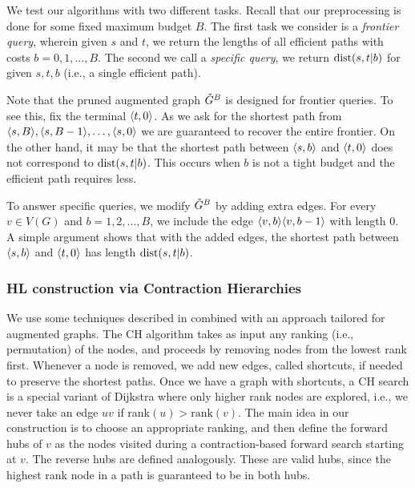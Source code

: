 \documentclass[opre,nonblindrev]{informs3} %
\begin{document}
We test our algorithms with two different tasks.
Recall that our preprocessing is done for some fixed maximum budget $B$.
The first task we consider is a \emph{frontier query}, wherein given $s$ and $t$, we return the lengths of all efficient paths with costs $b=0,1,\ldots,B$.
The second we call a \emph{specific query}, we return $\mbox{dist}(s,t|b)$ for given $s,t,b$ (i.e., a single efficient path).

Note that the pruned augmented graph $\tilde G^B$ is designed for frontier queries.
To see this, fix the terminal $\langle t,0\rangle$.
As we ask for the shortest path from $\langle s,B\rangle,\langle s,B-1\rangle,\ldots,\langle s,0\rangle$ we are guaranteed to recover the entire frontier.
On the other hand, it may be that the shortest path between $\langle s,b\rangle$ and $\langle t,0\rangle$ does not correspond to $\mbox{dist}(s,t|b)$.
This occurs when $b$ is not a tight budget and the efficient path requires less.

To answer specific queries, we modify $\tilde G^B$ by adding extra edges.
For every $v\in V(G)$ and $b=1,2,\ldots,B$, we include the edge $\langle v,b\rangle\langle v,b-1\rangle$ with length $0$.
A simple argument shows that with the added edges, the shortest path between $\langle s,b\rangle$ and $\langle t,0\rangle$ has length $\mbox{dist}(s,t|b)$.

\subsubsection{HL construction via Contraction Hierarchies}

We use some techniques described in \cite{hubimplem} combined with an approach tailored for augmented graphs.
The CH algorithm takes as input any ranking (i.e., permutation) of the nodes, and proceeds by removing nodes from the lowest rank first.
Whenever a node is removed, we add new edges, called shortcuts, if needed to preserve the shortest paths.
Once we have a graph with shortcuts, a CH search is a special variant of Dijkstra where only higher rank nodes are explored, i.e., we never take an edge $uv$ if rank$(u)>\text{rank}(v)$. 
The main idea in our construction is to choose an appropriate ranking, and then define the forward hubs of $v$ as the nodes visited during a contraction-based forward search starting at $v$.
The reverse hubs are defined analogously.
These are valid hubs, since the highest rank node in a path is guaranteed to be in both hubs.
\end{document}
